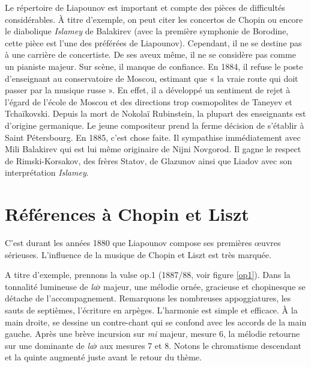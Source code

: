 \noindent Le répertoire de Liapounov est important et compte des pièces de difficultés considérables. À titre d'exemple, on peut citer les concertos de Chopin ou encore le diabolique \emph{Islamey} de Balakirev (avec la première symphonie de Borodine, cette pièce est l'une des préférées de Liapounov). Cependant, il ne se destine pas à une carrière de concertiste. De ses aveux même, il ne se considère pas comme un pianiste majeur. Sur scène, il manque de confiance. En 1884, il refuse le poste d'enseignant au conservatoire de Moscou, estimant que « la vraie route qui doit passer par la musique russe ». En effet, il a développé un sentiment de rejet à l'égard de l'école de Moscou et des directions trop cosmopolites de Taneyev et Tchaïkovski. Depuis la mort de Nokolaï Rubinstein, la plupart des enseignants est d'origine germanique. Le jeune compositeur prend la ferme décision de s'établir à Saint Pétersbourg. En 1885, c'est chose faite. Il sympathise immédiatement avec Mili Balakirev qui est lui même originaire de Nijni Novgorod. Il gagne le respect de Rimski-Korsakov, des frères Statov, de Glazunov ainsi que Liadov avec son interprétation \emph{Islamey}.

\section{Références à Chopin et Liszt}

C'est durant les années 1880 que Liapounov compose ses premières œuvres sérieuses. L'influence de la musique de Chopin et Liszt est très marquée.

A titre d'exemple, prennons la valse op.1 (1887/88, voir figure \ref{op1}). Dans la tonnalité lumineuse de \emph{la}$\flat$ majeur, une mélodie ornée, gracieuse et chopinesque se détache de l'accompagnement. Remarquons les nombreuses appoggiatures, les sauts de septièmes, l'écriture en arpèges. L'harmonie est simple et efficace. À la main droite, se dessine un contre-chant qui se confond avec les accords de la main gauche. Après une brève incursion sur \emph{mi} majeur, mesure 6, la mélodie retourne sur une dominante de \emph{la}$\flat$ aux mesures 7 et 8. Notons le chromatisme descendant et la quinte augmenté juste avant le retour du thème.

